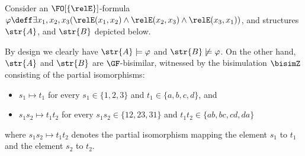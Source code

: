 \begin{example}
  Consider an $\FO[\{\relE\}]$-formula $\varphi \deff \exists{x_{1}, x_{2}, x_{3}}(\relE(x_{1}, x_{2}) \land \relE(x_{2}, x_{3}) \land \relE(x_{3}, x_{1}))$, and structures $\str{A}$, and $\str{B}$ depicted below.
  \begin{figure}[H]
  \centering
  \end{figure}
  By design we clearly have $\str{A}\models \varphi$ and $\str{B} \not\models \varphi$. On the other hand, $\str{A}$ and $\str{B}$ are $\GF$-bisimilar, witnessed by the bisimulation $\bisimZ$ consisting of the partial isomorphisms:
  \begin{itemize}
    \item $s_{1} \mapsto t_{1}$ for every $s_{1} \in \{1,2,3\}$ and $t_{1} \in \{a,b,c,d\}$, and
    \item $s_{1}s_{2} \mapsto t_{1}t_{2}$ for every $s_{1}s_{2} \in \{12,23,31\}$ and $t_{1}t_{2} \in \{ab,bc,cd,da\}$
  \end{itemize}
  where $s_{1}s_{2} \mapsto t_{1}t_{2}$ denotes the partial isomorphism mapping the element $s_{1}$ to $t_{1}$ and the element $s_{2}$ to $t_{2}$.
\end{example}



